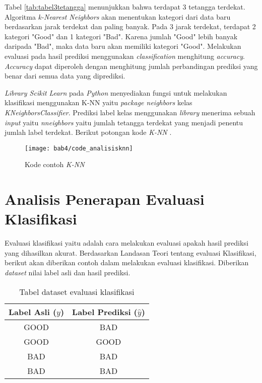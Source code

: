 Tabel \ref{tab:tabel3tetangga} menunjukkan bahwa terdapat 3 tetangga terdekat. Algoritma \textit{k-Nearest Neighbors} akan menentukan kategori dari data baru berdasarkan jarak terdekat dan paling banyak. Pada 3 jarak terdekat, terdapat 2 kategori "Good" dan 1 kategori "Bad". Karena jumlah "Good" lebih banyak daripada "Bad", maka data baru akan memiliki kategori "Good". Melakukan evaluasi pada hasil prediksi menggunakan \textit{classification} menghitung \textit{accuracy}. \textit{Accuracy} dapat diperoleh dengan menghitung jumlah perbandingan prediksi yang benar dari semua data yang diprediksi.

\textit{Library Scikit Learn} pada \textit{Python} menyediakan fungsi untuk melakukan klasifikasi menggunakan K-NN yaitu \textit{package neighbors} kelas \textit{KNeighborsClassifier}. Prediksi label kelas menggunakan \textit{library} menerima sebuah \textit{input} yaitu \textit{n\textunderscore neighbors} yaitu jumlah tetangga terdekat yang menjadi penentu jumlah label terdekat. Berikut potongan kode \textit{K-NN} .



%
%
%

\begin{figure}[H]
	\centering  
	\texttt{[image: bab4/code\_analisisknn]}   
	\caption{Kode contoh \textit{K-NN}}
	\label{fig:code_analisisknn} 
\end{figure} 

\section{Analisis Penerapan Evaluasi Klasifikasi}
Evaluasi klasifikasi yaitu adalah cara melakukan evaluasi apakah hasil prediksi yang dihasilkan akurat. Berdasarkan Landasan Teori tentang evaluasi Klasifikasi, berikut akan diberikan contoh dalam melakukan evaluasi klasifikasi. Diberikan \textit{dataset} nilai label asli dan hasil prediksi.


\begin{table}[H]
\caption{Tabel dataset evaluasi klasifikasi}
\centering
\begin{tabular}{|c|c|}
\hline 
Label Asli ($y$) & Label Prediksi ($\hat{y}$) \\ 
\hline 
GOOD & BAD \\ 
\hline 
GOOD & GOOD \\ 
\hline 
BAD & BAD \\ 
\hline 
BAD & BAD \\ 
\hline 
\end{tabular} 
\label{tab:tabelevaluasiklasifikasi}
\end{table}

